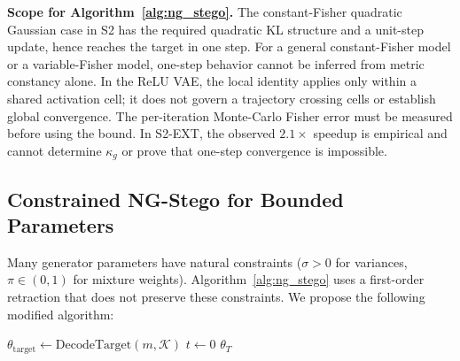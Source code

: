 \documentclass[a4paper,fleqn]{cas-dc}
\begin{document}
\noindent\textbf{Scope for Algorithm~\ref{alg:ng_stego}.}
The constant-Fisher quadratic Gaussian case in S2 has the required
quadratic KL structure and a unit-step update, hence reaches the target
in one step. For a general constant-Fisher model or a variable-Fisher
model, one-step behavior cannot be inferred from metric constancy alone.
In the ReLU VAE, the local identity applies only within a shared
activation cell; it does not govern a trajectory crossing cells or
establish global convergence. The per-iteration Monte-Carlo Fisher
error must be measured before using the bound. In S2-EXT, the observed
$2.1\times$ speedup is empirical and cannot determine $\kappa_g$ or
prove that one-step convergence is impossible.

\subsection{Constrained NG-Stego for Bounded Parameters}

Many generator parameters have natural constraints ($\sigma > 0$ for
variances, $\pi \in (0,1)$ for mixture weights).  Algorithm~\ref{alg:ng_stego}
uses a first-order retraction that does not preserve these constraints.
We propose the following modified algorithm:

\begin{algorithm}[t]
\caption{Constrained NG-Stego}
\label{alg:ng_stego_constrained}
$\theta_{\mathrm{target}} \leftarrow \mathrm{DecodeTarget}(m,\mathcal{K})$\;
$t \leftarrow 0$\;
\Return $\theta_T$\;
\end{algorithm}
\end{document}
